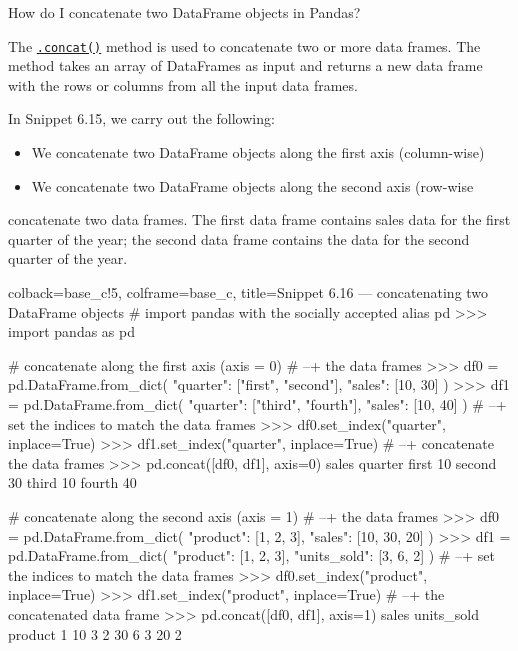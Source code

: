 \documentclass[a4paper,11pt]{book}
\numberwithin{figure}{chapter}
\numberwithin{table}{chapter}
\newcommand{\question}[1]{%
    \begin{tcolorbox}[colback=comp_c!10,colframe=comp_c,sidebyside align=top,width=\linewidth,before skip=1ex]
        #1
    \end{tcolorbox}
    \switchcolumn%
}
\newcommand{\note}[1]{%
    \begin{tcolorbox}[colback=white!0,colframe=white!10,width=\linewidth,before skip=1ex]
        #1
    \end{tcolorbox}
}
\begin{document}
\begin{paracol}{2}
	\question{\raggedright How do I concatenate two DataFrame objects in Pandas?}
	\note{The \href{https://pandas.pydata.org/docs/reference/api/pandas.concat.html?highlight=concat#pandas.concat}{\texttt{.concat()}} method is used to concatenate two or more data frames. The method takes an array of DataFrames as input and returns a new data frame with the rows or columns from all the input data frames.
	
	\quad In Snippet 6.15, we carry out the following:
	
	\begin{itemize}
		\item We concatenate two DataFrame objects along the first axis (column-wise)
		\item We concatenate two DataFrame objects along the second axis (row-wise
	\end{itemize}
	
	\quad concatenate two data frames. The first data frame contains sales data for the first quarter of the year; the second data frame contains the data for the second quarter of the year.
	}
\end{paracol}

\begin{pythoncode}[linenos=True]{colback=base_c!5, colframe=base_c, title=\sffamily Snippet 6.16 --- concatenating two DataFrame objects}
# import pandas with the socially accepted alias pd
>>> import pandas as pd

# concatenate along the first axis (axis = 0)
# --+ the data frames 
>>> df0 = pd.DataFrame.from_dict(
	{"quarter": ["first", "second"], "sales": [10, 30]}
    )
>>> df1 = pd.DataFrame.from_dict(
	{"quarter": ["third", "fourth"], "sales": [10, 40]}
    )
# --+ set the indices to match the data frames
>>> df0.set_index("quarter", inplace=True)
>>> df1.set_index("quarter", inplace=True)
# --+ concatenate the data frames
>>> pd.concat([df0, df1], axis=0)
         sales
quarter       
first       10
second      30
third       10
fourth      40

# concatenate along the second axis (axis = 1) 
# --+ the data frames
>>> df0 = pd.DataFrame.from_dict(
	{"product": [1, 2, 3], "sales": [10, 30, 20]}
    )
>>> df1 = pd.DataFrame.from_dict(
	{"product": [1, 2, 3], "units_sold": [3, 6, 2]}
    )
# --+ set the indices to match the data frames
>>> df0.set_index("product", inplace=True)
>>> df1.set_index("product", inplace=True)
# --+ the concatenated data frame
>>> pd.concat([df0, df1], axis=1)
         sales  units_sold
product                   
1           10           3
2           30           6
3           20           2

\end{pythoncode}
\clearpage
\end{document}
